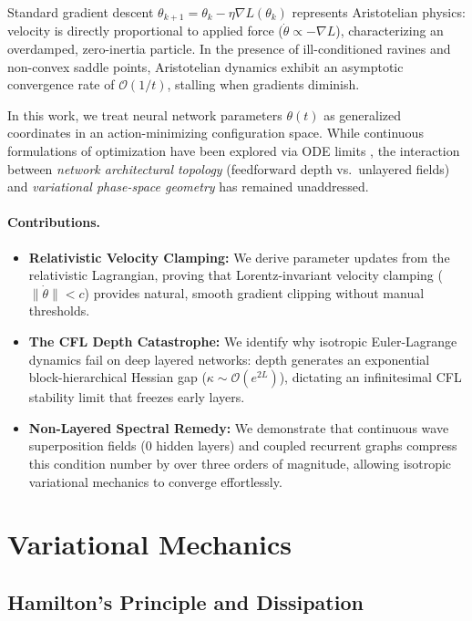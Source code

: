 \documentclass[10pt,twocolumn]{article}
\begin{document}
Standard gradient descent $\theta_{k+1} = \theta_k - \eta \nabla L(\theta_k)$ represents Aristotelian physics: velocity is directly proportional to applied force ($\dot{\theta} \propto -\nabla L$), characterizing an overdamped, zero-inertia particle. In the presence of ill-conditioned ravines and non-convex saddle points, Aristotelian dynamics exhibit an asymptotic convergence rate of $\mathcal{O}(1/t)$, stalling when gradients diminish.

In this work, we treat neural network parameters $\theta(t)$ as generalized coordinates in an action-minimizing configuration space. While continuous formulations of optimization have been explored via ODE limits \cite{su2016differential,wibisono2016variational}, the interaction between \textit{network architectural topology} (feedforward depth vs.\ unlayered fields) and \textit{variational phase-space geometry} has remained unaddressed.

\paragraph{Contributions.}
\begin{itemize}
    \item \textbf{Relativistic Velocity Clamping:} We derive parameter updates from the relativistic Lagrangian, proving that Lorentz-invariant velocity clamping ($\|\dot{\theta}\| < c$) provides natural, smooth gradient clipping without manual thresholds.
    \item \textbf{The CFL Depth Catastrophe:} We identify why isotropic Euler-Lagrange dynamics fail on deep layered networks: depth generates an exponential block-hierarchical Hessian gap ($\kappa \sim \mathcal{O}(e^{2L})$), dictating an infinitesimal CFL stability limit that freezes early layers.
    \item \textbf{Non-Layered Spectral Remedy:} We demonstrate that continuous wave superposition fields (0 hidden layers) and coupled recurrent graphs compress this condition number by over three orders of magnitude, allowing isotropic variational mechanics to converge effortlessly.
\end{itemize}

\section{Variational Mechanics}

\subsection{Hamilton's Principle and Dissipation}
\end{document}
